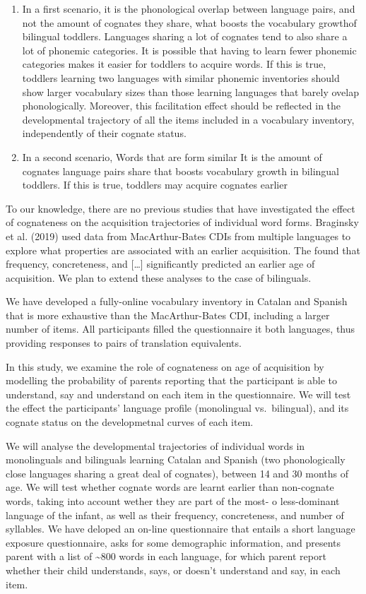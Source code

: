 \documentclass[english,man,man,floatsintext]{apa6}
\begin{document}
\begin{enumerate}
\def\labelenumi{\arabic{enumi})}
\item
  In a first scenario, it is the phonological overlap between language pairs, and not the amount of cognates they share, what boosts the vocabulary growthof bilingual toddlers. Languages sharing a lot of cognates tend to also share a lot of phonemic categories. It is possible that having to learn fewer phonemic categories makes it easier for toddlers to acquire words. If this is true, toddlers learning two languages with similar phonemic inventories should show larger vocabulary sizes than those learning languages that barely ovelap phonologically. Moreover, this facilitation effect should be reflected in the developmental trajectory of all the items included in a vocabulary inventory, independently of their cognate status.
\item
  In a second scenario, Words that are form similar It is the amount of cognates language pairs share that boosts vocabulary growth in bilingual toddlers. If this is true, toddlers may acquire cognates earlier
\end{enumerate}

To our knowledge, there are no previous studies that have investigated the effect of cognateness on the acquisition trajectories of individual word forms. Braginsky et al. (2019) used data from MacArthur-Bates CDIs from multiple languages to explore what properties are associated with an earlier acquisition. The found that frequency, concreteness, and {[}\ldots{}{]} significantly predicted an earlier age of acquisition. We plan to extend these analyses to the case of bilinguals.

We have developed a fully-online vocabulary inventory in Catalan and Spanish that is more exhaustive than the MacArthur-Bates CDI, including a larger number of items. All participants filled the questionnaire it both languages, thus providing responses to pairs of translation equivalents.

In this study, we examine the role of cognateness on age of acquisition by modelling the probability of parents reporting that the participant is able to understand, say and understand on each item in the questionnaire. We will test the effect the participants' language profile (monolingual vs.~bilingual), and its cognate status on the developmetnal curves of each item.

We will analyse the developmental trajectories of individual words in monolinguals and bilinguals learning Catalan and Spanish (two phonologically close languages sharing a great deal of cognates), between 14 and 30 months of age. We will test whether cognate words are learnt earlier than non-cognate words, taking into account wether they are part of the most- o less-dominant language of the infant, as well as their frequency, concreteness, and number of syllables. We have deloped an on-line questionnaire that entails a short language exposure questionnaire, asks for some demographic information, and presents parent with a list of \textasciitilde{}800 words in each language, for which parent report whether their child understands, says, or doesn't understand and say, in each item.
\end{document}
